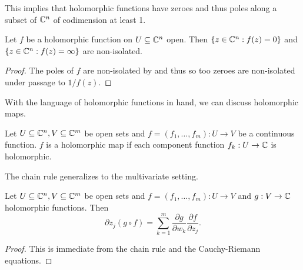 This implies that holomorphic functions have zeroes and thus poles along a subset of $\mathbb{C}^{n}$ of codimension at least 1. 
\begin{corollary}\label{corr: nonisolated zeroes and poles}
    Let $f$ be a holomorphic function on $U\subseteq\mathbb{C}^{n}$ open. Then $\{z\in\mathbb{C}^{n}:f(z)=0\}$ and $\{z\in\mathbb{C}^{n}:f(z)=\infty\}$ are non-isolated. 
\end{corollary}
\begin{proof}
    The poles of $f$ are non-isolated by  and thus so too zeroes are non-isolated under passage to $1/f(z)$. 
\end{proof}
With the language of holomorphic functions in hand, we can discuss holomorphic maps. 
\begin{definition}\label{def: holomorphic map}
    Let $U\subseteq\mathbb{C}^{n},V\subseteq\mathbb{C}^{m}$ be open sets and $f=(f_{1},\dots,f_{m}):U\to V$ be a continuous function. $f$ is a holomorphic map if each component function $f_{k}:U\to\mathbb{C}$ is holomorphic. 
\end{definition}
The chain rule generalizes to the multivariate setting. 
\begin{proposition}\label{prop: multivariate chain rule}
    Let $U\subseteq\mathbb{C}^{n},V\subseteq\mathbb{C}^{m}$ be open sets and $f=(f_{1},\dots,f_{m}):U\to V$ and $g:V\to\mathbb{C}$ holomorphic functions. Then 
    $$\partial z_{j}(g\circ f)=\sum_{k=1}^{m}\frac{\partial g}{\partial w_{k}}\frac{\partial f}{\partial z_{j}}.$$
\end{proposition}
\begin{proof}
    This is immediate from the chain rule and the Cauchy-Riemann equations. 
\end{proof}